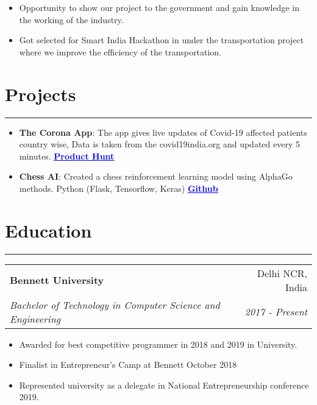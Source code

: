 \documentclass[a4paper,6pt]{article}
\begin{document}
\small
\begin{itemize}
	\itemsep0em
	\item Opportunity to show our project to the government and gain knowledge in the working of the industry.
	\item Got selected for Smart India Hackathon in under the transportation project where we improve the efficiency of the transportation.
\end{itemize}

\normalsize

\vspace{-9px}
\section*{Projects}
\vspace{-8px}
\hrule
\vspace{7px}
\begin{itemize}
    \item \textbf{The Corona App}: \small The app gives live updates of Covid-19 affected patients country wise, Data is taken from the covid19india.org and updated every 5 minutes. \href{https://www.producthunt.com/posts/the-f-cking-corona}{\textcolor{blue}{\textbf{\underline{Product Hunt}}}}
\normalsize
\vspace{2px}
	\item \textbf{Chess AI}: \small Created a chess reinforcement learning model using AlphaGo methods. Python (Flask, Tensorflow, Keras) \href{https://github.com/shreyaspapi/flask-chess-ai}{\textcolor{blue}{\textbf{\underline{Github}}}}

\normalsize
\end{itemize}

\section*{Education}
\vspace{-8px}
\hrule
\vspace{4px}
\begin{tabularx}{\textwidth}{X r}
	\textbf{Bennett University} & Delhi NCR, India \vspace{2px} \\
	\textit{\small Bachelor of Technology in Computer Science and Engineering } & \textit{2017 - Present} 
\end{tabularx}

\vspace{2px}

\begin{itemize}
    \item Awarded for best competitive programmer in 2018 and 2019 in University.
    \item Finalist in Entrepreneur's Camp at Bennett October 2018
    \item Represented university as a delegate in National Entrepreneurship conference 2019.
\end{itemize}
\end{document}
